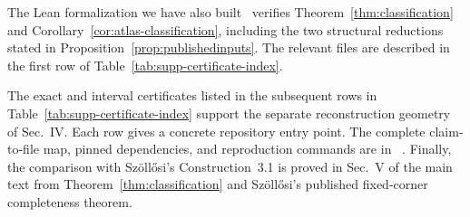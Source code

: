 \documentclass[aps,prx,reprint,nofootinbib,twoside,superscriptaddress,longbibliography,floatfix]{revtex4-2}
\theoremstyle{definition}
\begin{document}
The Lean formalization we have also built~\cite{CardenesWuttig2026HadamardRepository} verifies Theorem~\ref{thm:classification} and
Corollary~\ref{cor:atlas-classification}, including the two structural
reductions stated in Proposition~\ref{prop:publishedinputs}. The relevant files are described in the first row of Table~\ref{tab:supp-certificate-index}.

The exact and interval certificates listed in the subsequent rows in Table~\ref{tab:supp-certificate-index}
support the separate reconstruction geometry of Sec.~IV. Each row gives
a concrete repository entry point. The complete claim-to-file map, pinned
dependencies, and reproduction commands are in
~\cite{CardenesWuttig2026HadamardRepository}.
Finally, the comparison
with Sz\"oll\H{o}si's Construction~3.1 is proved in Sec.~V of the main text
from Theorem~\ref{thm:classification} and Sz\"oll\H{o}si's published
fixed-corner completeness theorem.
\end{document}
